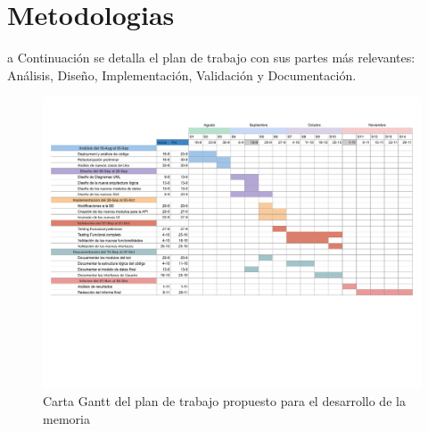 \section{Metodologias}\label{sec:intro-met}
    \par a Continuación se detalla el plan de trabajo con sus partes más relevantes: Análisis, Diseño, Implementación, Validación y Documentación. 
    \begin{figure}[h]
        \centering
        \includegraphics[width=\textwidth]{media/imagenes/planificacion/plan_de_trabajo.pdf}
        \caption{Carta Gantt del plan de trabajo propuesto para el desarrollo de la memoria}
        \label{fig:gantt}
    \end{figure}
